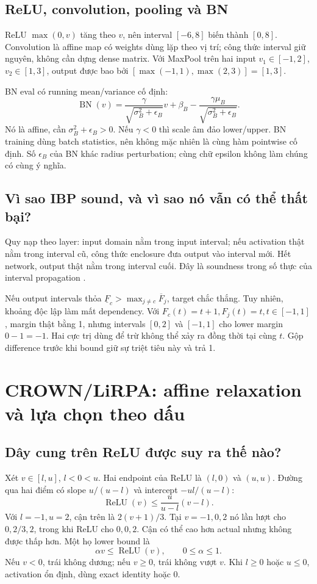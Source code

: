 \documentclass[11pt,a4paper]{article}
\newcommand{\relu}{\operatorname{ReLU}}
\theoremstyle{definition}
\begin{document}
\subsection{ReLU, convolution, pooling và BN}
ReLU $\max(0,v)$ tăng theo $v$, nên interval $[-6,8]$ biến thành $[0,8]$.
Convolution là affine map có weights dùng lặp theo vị trí; công thức interval
giữ nguyên, không cần dựng dense matrix. Với MaxPool trên hai input
$v_1\in[-1,2]$, $v_2\in[1,3]$, output được bao bởi
$[\max(-1,1),\max(2,3)]=[1,3]$.

BN eval có running mean/variance cố định:
\begin{equation}
\operatorname{BN}(v)=\frac{\gamma}{\sqrt{\sigma_B^2+\epsilon_B}}v+
\beta_B-\frac{\gamma\mu_B}{\sqrt{\sigma_B^2+\epsilon_B}}.
\end{equation}
Nó là affine, cần $\sigma_B^2+\epsilon_B>0$. Nếu $\gamma<0$ thì scale âm
đảo lower/upper. BN training dùng batch statistics, nên không mặc nhiên
là cùng hàm pointwise cố định. Số $\epsilon_B$ của BN khác radius
perturbation; cùng chữ epsilon không làm chúng có cùng ý nghĩa.

\subsection{Vì sao IBP sound, và vì sao nó vẫn có thể thất bại?}
Quy nạp theo layer: input domain nằm trong input interval; nếu activation
thật nằm trong interval cũ, công thức enclosure đưa output vào interval
mới. Hết network, output thật nằm trong interval cuối. Đây là soundness
trong số thực của interval propagation \cite{ibp}.

Nếu output intervals thỏa $\underline F_c>\max_{j\ne c}\overline F_j$, target
chắc thắng. Tuy nhiên, khoảng độc lập làm mất dependency. Với
$F_c(t)=t+1,F_j(t)=t,t\in[-1,1]$, margin thật bằng 1, nhưng intervals
$[0,2]$ và $[-1,1]$ cho lower margin $0-1=-1$. Hai cực trị dùng để trừ
không thể xảy ra đồng thời tại cùng $t$. Gộp difference trước khi bound
giữ sự triệt tiêu này và trả 1.

\section{CROWN/LiRPA: affine relaxation và lựa chọn theo dấu}
\subsection{Dây cung trên ReLU được suy ra thế nào?}
Xét $v\in[l,u]$, $l<0<u$. Hai endpoint của ReLU là $(l,0)$ và $(u,u)$.
Đường qua hai điểm có slope $u/(u-l)$ và intercept $-ul/(u-l)$:
\begin{equation}
\relu(v)\le\frac{u}{u-l}(v-l).
\end{equation}
Với $l=-1,u=2$, cận trên là $2(v+1)/3$. Tại $v=-1,0,2$ nó lần lượt
cho $0,2/3,2$, trong khi ReLU cho $0,0,2$. Cận có thể cao hơn actual
nhưng không được thấp hơn. Một họ lower bound là
\begin{equation}
\alpha v\le\relu(v),\qquad0\le\alpha\le1.
\end{equation}
Nếu $v<0$, trái không dương; nếu $v\ge0$, trái không vượt $v$. Khi
$l\ge0$ hoặc $u\le0$, activation ổn định, dùng exact identity hoặc 0.
\end{document}
